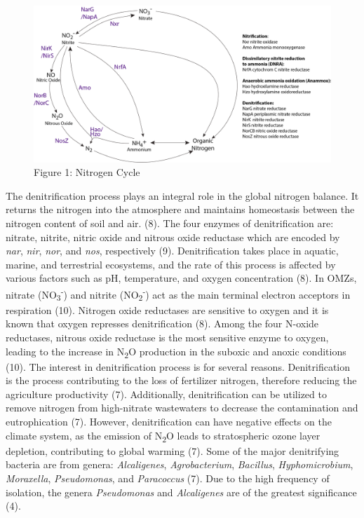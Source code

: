 \documentclass[11 pt,]{article}
\begin{document}
\begin{figure}
\centering
\includegraphics{N_Cycle_Figure.png}
\caption{Figure 1: Nitrogen Cycle}
\end{figure}

The denitrification process plays an integral role in the global
nitrogen balance. It returns the nitrogen into the atmosphere and
maintains homeostasis between the nitrogen content of soil and air. (8).
The four enzymes of denitrification are: nitrate, nitrite, nitric oxide
and nitrous oxide reductase which are encoded by \emph{nar}, \emph{nir},
\emph{nor}, and \emph{nos}, respectively (9). Denitrification takes
place in aquatic, marine, and terrestrial ecosystems, and the rate of
this process is affected by various factors such as pH, temperature, and
oxygen concentration (8). In OMZs, nitrate
(NO\textsubscript{3}\textsuperscript{-}) and nitrite
(NO\textsubscript{2}\textsuperscript{-}) act as the main terminal
electron acceptors in respiration (10). Nitrogen oxide reductases are
sensitive to oxygen and it is known that oxygen represses
denitrification (8). Among the four N-oxide reductases, nitrous oxide
reductase is the most sensitive enzyme to oxygen, leading to the
increase in N\textsubscript{2}O production in the suboxic and anoxic
conditions (10). The interest in denitrification process is for several
reasons. Denitrification is the process contributing to the loss of
fertilizer nitrogen, therefore reducing the agriculture productivity
(7). Additionally, denitrification can be utilized to remove nitrogen
from high-nitrate wastewaters to decrease the contamination and
eutrophication (7). However, denitrification can have negative effects
on the climate system, as the emission of N\textsubscript{2}O leads to
stratospheric ozone layer depletion, contributing to global warming (7).
Some of the major denitrifying bacteria are from genera:
\emph{Alcaligenes}, \emph{Agrobacterium}, \emph{Bacillus},
\emph{Hyphomicrobium}, \emph{Moraxella}, \emph{Pseudomonas}, and
\emph{Paracoccus} (7). Due to the high frequency of isolation, the
genera \emph{Pseudomonas} and \emph{Alcaligenes} are of the greatest
significance (4).
\end{document}
